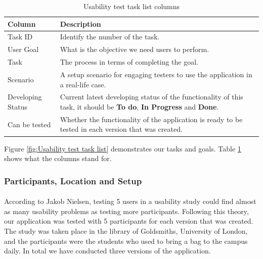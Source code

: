 \documentclass[12pt,a4paper]{article}
\begin{document}
            \begin{table}[H]
              \centering
                \begin{tabularx}{\textwidth}{l X}
                  \hline
                  Column & Description  \\ \hline
                  Task ID & Identify the number of the task.  \\ 
                  User Goal & What is the objective we need users to perform.  \\ 
                  Task & The process in terms of completing the goal.  \\ 
                  Scenario & A setup scenario for engaging testers to use the application in a real-life case.   \\ 
                  Developing Status & Current latest developing status of the functionality of this task, it should be {\bf To do}, {\bf In Progress} and {\bf Done}.\\ 
                  Can be tested &  Whether the functionality of the application is ready to be tested in each version that was created.\\ 
                  \hline
                \end{tabularx}
                \caption[Table caption text]{Usability test task list columns}
                \label{table:Usability test task list columns}
            \end{table}

            Figure \ref{fig:Usability test task list} demonstrates our tasks and goals. Table \ref{table:Usability test task list columns} shows what the columns stand for.

        \subsubsection{Participants, Location and Setup}
          \paragraph{} According to Jakob Nielsen, testing 5 users in a usability study could find almost as many usability problems as testing more participants\cite{HowManyTestUsers}. Following this theory, our application was tested with 5 participants for each version that was created. The study was taken place in the library of Goldsmiths, University of London, and the participants were the students who used to bring a bag to the campus daily. In total we have conducted three versions of the application.
          
\end{document}
